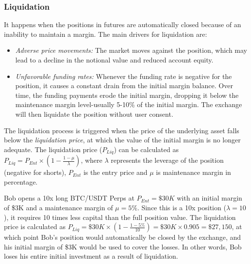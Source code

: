 \subsubsection{Liquidation}\label{subsec:liquidation}
It happens when the positions in futures are automatically closed because of an inability to maintain a margin. The main drivers for liquidation are:
\begin{itemize}
	\item \textsl{Adverse price movements:} The market moves against the position, which may lead to a decline in the notional value and reduced account equity.
	
	\item \textsl{Unfavorable funding rates:} Whenever the funding rate is negative for the position, it causes a constant drain from the initial margin balance. Over time, the funding payments erode the initial margin, dropping it below the maintenance margin level-usually 5-10\% of the initial margin. The exchange will then liquidate the position without user consent.
\end{itemize}
The liquidation process is triggered when the price of the underlying asset falls below the \textit{liquidation price}, at which the value of the initial margin is no longer adequate. The liquidation price ($P_{Liq}$) can be calculated as \(P_{Liq} = P_{Ent} \times \left( 1 - \frac{1 - \mu}{\lambda} \right)\), where \(\lambda\) represents the leverage of the position (negative for shorts), \(P_{Ent}\) is the entry price and \(\mu\) is maintenance margin in percentage.

\begin{example}\label{ex:funding2}
	Bob opens a 10x long BTC/USDT Perps at \(P_{Ent} = \$30K\) with an initial margin of \$3K and a maintenance margin of \(\mu = 5\%\). Since this is a 10x position (\(\lambda = 10\)), it requires 10 times less capital than the full position value. The liquidation price is calculated as \(P_{Liq} = \$30K \times ( 1 - \frac{1 - 5\%}{10} ) = \$30K \times 0.905 = \$27,150\), at which point Bob’s position would automatically be closed by the exchange, and his initial margin of \$3K would be used to cover the losses. In other words, Bob loses his entire initial investment as a result of liquidation.
\end{example}